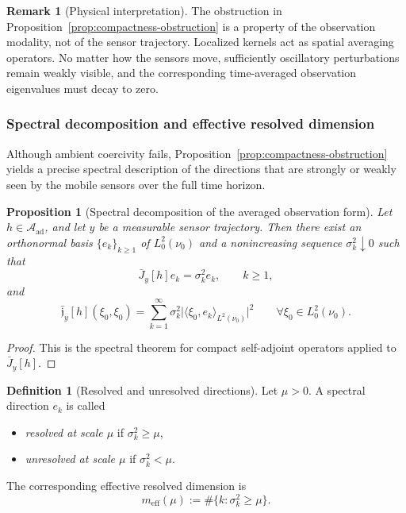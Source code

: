 \documentclass{article}
\newtheorem{proposition}[theorem]{Proposition}
\theoremstyle{definition}
\newtheorem{definition}[theorem]{Definition}
\newtheorem{remark}[theorem]{Remark}
\begin{document}
\begin{remark}[Physical interpretation]
    \label{rem:compactness-physical}
    The obstruction in Proposition~\ref{prop:compactness-obstruction} is a property of the observation
    modality, not of the sensor trajectory. Localized kernels act as spatial averaging operators. No
    matter how the sensors move, sufficiently oscillatory perturbations remain weakly visible, and the
    corresponding time-averaged observation eigenvalues must decay to zero.
\end{remark}

\subsubsection{Spectral decomposition and effective resolved dimension}

Although ambient coercivity fails, Proposition~\ref{prop:compactness-obstruction} yields a precise
spectral description of the directions that are strongly or weakly seen by the mobile sensors over
the full time horizon.

\begin{proposition}[Spectral decomposition of the averaged observation form]
    \label{prop:spectral-decomposition-mobile}
    Let \(h\in\mathcal A_{\mathrm{ad}}\), and let \(y\) be a measurable sensor trajectory. Then there
    exist an orthonormal basis \(\{e_k\}_{k\ge 1}\) of \(L^2_0(\nu_0)\) and a nonincreasing sequence
    \(\sigma_k^2\downarrow 0\) such that
    \[
        \bar J_y[h]e_k=\sigma_k^2 e_k,
        \qquad k\ge 1,
    \]
    and
    \begin{equation}
        \label{eq:spectral-expansion-mobile}
        \bar{\mathfrak j}_y[h](\xi_0,\xi_0)
        =
        \sum_{k=1}^\infty \sigma_k^2
        \bigl|\langle \xi_0,e_k\rangle_{L^2(\nu_0)}\bigr|^2
        \qquad
        \forall \xi_0\in L^2_0(\nu_0).
    \end{equation}
\end{proposition}

\begin{proof}
    This is the spectral theorem for compact self-adjoint operators applied to \(\bar J_y[h]\).
\end{proof}

\begin{definition}[Resolved and unresolved directions]
    \label{def:resolved-unresolved}
    Let \(\mu>0\). A spectral direction \(e_k\) is called
    \begin{itemize}
        \item \emph{resolved at scale \(\mu\)} if \(\sigma_k^2\ge \mu\),
        \item \emph{unresolved at scale \(\mu\)} if \(\sigma_k^2<\mu\).
    \end{itemize}
    The corresponding effective resolved dimension is
    \begin{equation}
        \label{eq:effective-dimension}
        m_{\mathrm{eff}}(\mu)
        :=
        \#\{k:\sigma_k^2\ge \mu\}.
    \end{equation}
\end{definition}
\end{document}
